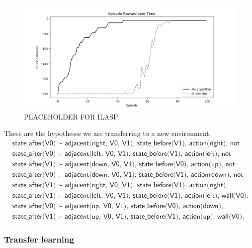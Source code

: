 \begin{figure}[!htb]
\centering
\includegraphics[width=1.0\textwidth]{./figures/experiment1_test}
\caption{PLACEHOLDER FOR ILASP}
\label{experiment1_test}
\end{figure}

These are the hypotheses we are transferring to a new environment.
\begin{equation*}
\begin{split}
 &\textsf{state\_after(V0) :- adjacent(right, V0, V1), state\_before(V1), action(right), not wall(V0).}\\
 &\textsf{state\_after(V0) :- adjacent(left, V0, V1), state\_before(V1), action(left), not wall(V0).}\\
 &\textsf{state\_after(V1) :- adjacent(down, V0, V1), state\_before(V0), action(up), not wall(V1).}\\
 &\textsf{state\_after(V0) :- adjacent(down, V0, V1), state\_before(V1), action(down), not wall(V0).}\\
 &\textsf{state\_after(V1) :- adjacent(right, V0, V1), state\_before(V1), action(right), wall(V0).}\\
 &\textsf{state\_after(V1) :- adjacent(left, V0, V1), state\_before(V1), action(left), wall(V0).}\\
 &\textsf{state\_after(V0) :- adjacent(up, V0, V1), state\_before(V0), action(down), wall(V1).}\\
 &\textsf{state\_after(V1) :- adjacent(up, V0, V1), state\_before(V1), action(up), wall(V0).}
\end{split}
\end{equation*}

\subsubsection{Transfer learning}

